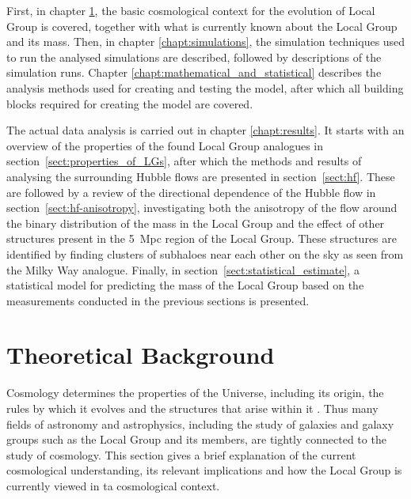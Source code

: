 \documentclass[english, twoside]{HYgradu}
\begin{document}
First, in chapter \ref{chapt:theoretical_background}, the basic cosmological context for the evolution of Local Group is covered, together with what is currently known about the Local Group and its mass. Then, in chapter \ref{chapt:simulations}, the simulation techniques used to run the analysed simulations are described, followed by descriptions of the simulation runs. Chapter \ref{chapt:mathematical_and_statistical} describes the analysis methods used for creating and testing the model, after which all building blocks required for creating the model are covered.

The actual data analysis is carried out in chapter \ref{chapt:results}. It starts with an overview of the properties of the found Local Group analogues in section~\ref{sect:properties_of_LGs}, after which the methods and results of analysing the surrounding Hubble flows are presented in section~\ref{sect:hf}. These are followed by a review of the directional dependence of the Hubble flow in section~\ref{sect:hf-anisotropy}, investigating both the anisotropy of the flow around the binary distribution of the mass in the Local Group and the effect of other structures present in the 5~Mpc region of the Local Group. These structures are identified by finding clusters of subhaloes near each other on the sky as seen from the Milky Way analogue.
Finally, in section~\ref{sect:statistical_estimate}, a statistical model for predicting the mass of the Local Group based on the measurements conducted in the previous sections is presented.


\chapter{Theoretical Background} \label{chapt:theoretical_background}

Cosmology determines the properties of the Universe, including its origin, the rules by which it evolves and the structures that arise within it \citep{mo2010galaxy}. Thus many fields of astronomy and astrophysics, including the study of galaxies and galaxy groups such as the Local Group and its members, are tightly connected to the study of cosmology. This section gives a brief explanation of the current cosmological understanding, its relevant implications and how the Local Group is currently viewed in ta cosmological context.
\end{document}
